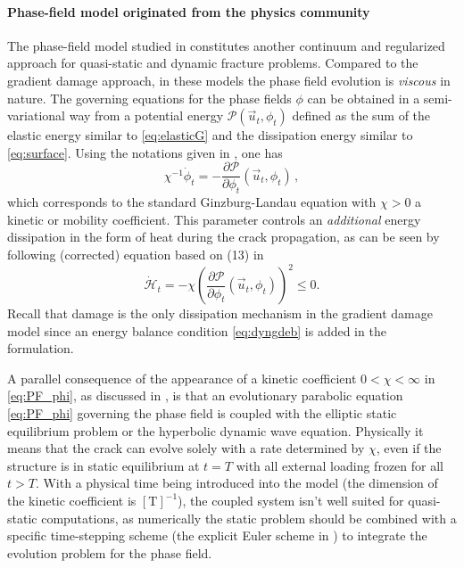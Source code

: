 \paragraph{Phase-field model originated from the physics community}
The phase-field model studied in \cite{KarmaKesslerLevine:2001,HakimKarma:2009} constitutes another continuum and regularized approach for quasi-static and dynamic fracture problems. Compared to the gradient damage approach, in these models the phase field evolution is \emph{viscous} in nature. The governing equations for the phase fields $\phi$ can be obtained in a semi-variational way from a potential energy $\mathcal{P}(\vec{u}_t,\phi_t)$ defined as the sum of the elastic energy similar to \eqref{eq:elasticG} and the dissipation energy similar to \eqref{eq:surface}. Using the notations given in \cite{HakimKarma:2009}, one has
\begin{equation} \label{eq:PF_phi}
\chi^{-1}\dot{\phi}_t=-\frac{\partial\mathcal{P}}{\partial\phi_t}(\vec{u}_t,\phi_t)\,,
\end{equation}
which corresponds to the standard Ginzburg-Landau equation with $\chi>0$ a kinetic or mobility \cite{KuhnMuller:2010} coefficient. This parameter controls an \emph{additional} energy dissipation in the form of heat during the crack propagation, as can be seen by following (corrected) equation based on (13) in \cite{HakimKarma:2009}
\begin{equation} \label{eq:PF_dissipation}
\dot{\mathcal{H}}_t=-\chi\left(\frac{\partial\mathcal{P}}{\partial\phi_t}(\vec{u}_t,\phi_t)\right)^2\leq 0.
\end{equation}
Recall that damage is the only dissipation mechanism in the gradient damage model since an energy balance condition \eqref{eq:dyngdeb} is added in the formulation.

A parallel consequence of the appearance of a kinetic coefficient $0<\chi<\infty$ in \eqref{eq:PF_phi}, as discussed in \cite{Bourdin:2011}, is that an evolutionary parabolic equation \eqref{eq:PF_phi} governing the phase field is coupled with the elliptic static equilibrium problem or the hyperbolic dynamic wave equation. Physically it means that the crack can evolve solely with a rate determined by $\chi$, even if the structure is in static equilibrium at $t=T$ with all external loading frozen for all $t>T$. With a physical time being introduced into the model (the dimension of the kinetic coefficient is $[\mathrm{T}]^{-1}$), the coupled system isn't well suited for quasi-static computations, as numerically the static problem should be combined with a specific time-stepping scheme (the explicit Euler scheme in \cite{HakimKarma:2009}) to integrate the evolution problem for the phase field.

